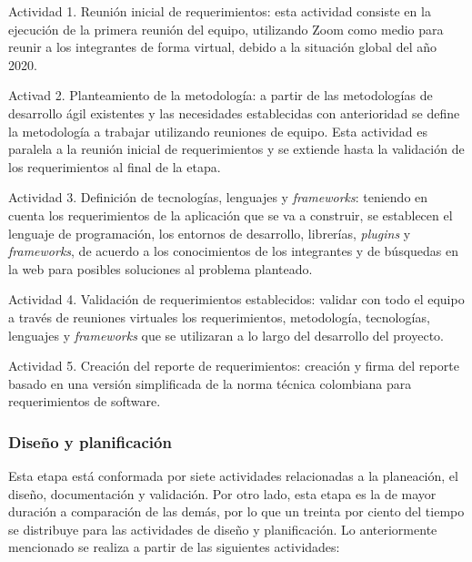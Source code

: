 \begin{APAitemize}
    \item Actividad 1. Reunión inicial de requerimientos: esta actividad consiste en la ejecución de la primera reunión del equipo, utilizando Zoom como medio para reunir a los integrantes de forma virtual, debido a la situación global del año 2020.
    \item Activad 2. Planteamiento de la metodología: a partir de las metodologías de desarrollo ágil existentes y las necesidades establecidas con anterioridad se define la metodología a trabajar utilizando reuniones de equipo. Esta actividad es paralela a la reunión inicial de requerimientos y se extiende hasta la validación de los requerimientos al final de la etapa.
    \item Actividad 3. Definición de tecnologías, lenguajes y \textit{frameworks}: teniendo en cuenta los requerimientos de la aplicación que se va a construir, se establecen el lenguaje de programación, los entornos de desarrollo, librerías, \textit{plugins} y \textit{frameworks}, de acuerdo a los conocimientos de los integrantes y de búsquedas en la web para posibles soluciones al problema planteado.
    \item Actividad 4. Validación de requerimientos establecidos: validar con todo el equipo a través de reuniones virtuales los requerimientos, metodología, tecnologías, lenguajes y \textit{frameworks} que se utilizaran a lo largo del desarrollo del proyecto.
    \item Actividad 5. Creación del reporte de requerimientos: creación y firma del reporte basado en una versión simplificada de la norma técnica colombiana para requerimientos de software. 
\end{APAitemize}

\subsubsection{Diseño y planificación}
Esta etapa está conformada por siete actividades relacionadas a la planeación, el diseño, documentación y validación. Por otro lado, esta etapa es la de mayor duración a comparación de las demás, por lo que un treinta por ciento del tiempo se distribuye para las actividades de diseño y planificación. Lo anteriormente mencionado se realiza a partir de las siguientes actividades:

